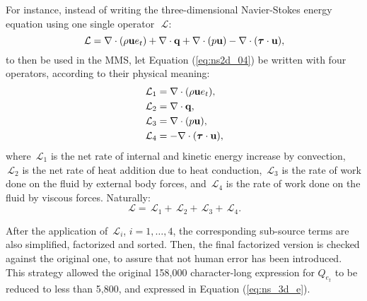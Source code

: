 \documentclass[10pt]{article}
\newcommand{\Diff}[2] {\dfrac{\partial( #1)}{\partial #2}}
\newcommand{\bv}[1]{\ensuremath{\mbox{\boldmath$ #1 $}}}
\newcommand{\Lo}{\,\mathcal{L}}
\begin{document}
For instance, instead of writing the three-dimensional Navier-Stokes energy equation using one single operator~$\Lo$:
\begin{equation}
 \label{eq:ns2d_04}
\Lo= \nabla \cdot (\rho\mathbf{u}e_t) +\nabla\cdot \mathbf{q} +  \nabla\cdot(p  \mathbf{u})  - \nabla \cdot (\bv{\tau} \cdot \mathbf{u}),
\end{equation}
to then be used in the MMS, let Equation (\ref{eq:ns2d_04}) be written with four operators, according to their physical meaning:
\begin{equation}
 \begin{split}
  \Lo_1&=\nabla \cdot (\rho\mathbf{u}e_t),\\
  \Lo_2&=\nabla\cdot \mathbf{q},\\
  \Lo_3&= \nabla\cdot(p  \mathbf{u}),\\
  \Lo_4&=- \nabla \cdot (\bv{\tau} \cdot \mathbf{u}),
 \end{split}
\end{equation}
where  $\Lo_1$ is the net rate of internal and kinetic energy increase by convection, $\Lo_2$ is the net rate of heat addition due to heat conduction, $\Lo_3$ is the rate of work done on the fluid by external body forces, and $\Lo_4$ is the rate of work done on the fluid by viscous forces. Naturally:
$$\Lo=\Lo_1+\Lo_2+\Lo_3+\Lo_4.$$

 After the application of $\Lo_i$, $i=1,\dots,4$, the corresponding sub-source terms are also simplified, factorized and sorted. Then, the final factorized version is checked against the original one, to assure that not human error has been introduced.  This strategy allowed the original  158,000 character-long  expression for $Q_{e_t}$ to be reduced to less than 5,800, and expressed in Equation (\ref{eq:ns_3d_e}).
\end{document}
